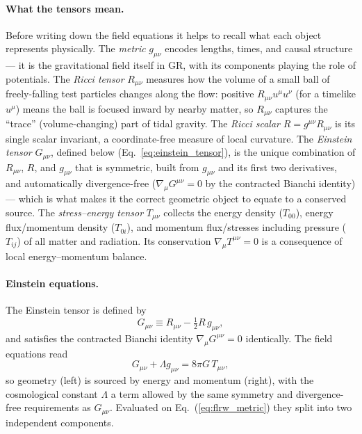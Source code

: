\documentclass[12pt]{article}
\begin{document}
\paragraph{What the tensors mean.}
Before writing down the field equations it helps to recall what each
object represents physically.  The \emph{metric} $g_{\mu\nu}$ encodes
lengths, times, and causal structure --- it is the gravitational
field itself in GR, with its components playing the role of
potentials.  The \emph{Ricci tensor} $R_{\mu\nu}$ measures how the
volume of a small ball of freely-falling test particles changes
along the flow: positive $R_{\mu\nu}u^\mu u^\nu$ (for a timelike
$u^\mu$) means the ball is focused inward by nearby matter, so
$R_{\mu\nu}$ captures the ``trace'' (volume-changing) part of tidal
gravity.  The \emph{Ricci scalar} $R = g^{\mu\nu}R_{\mu\nu}$ is its
single scalar invariant, a coordinate-free measure of local
curvature.  The \emph{Einstein tensor} $G_{\mu\nu}$, defined below
(Eq.~\ref{eq:einstein_tensor}), is the unique combination of
$R_{\mu\nu}$, $R$, and $g_{\mu\nu}$ that is symmetric, built from
$g_{\mu\nu}$ and its first two derivatives, and automatically
divergence-free ($\nabla_\mu G^{\mu\nu}=0$ by the contracted Bianchi
identity) --- which is what makes it the correct geometric object
to equate to a conserved source.  The \emph{stress--energy tensor} $T_{\mu\nu}$
collects the energy density ($T_{00}$), energy flux/momentum density
($T_{0i}$), and momentum flux/stresses including pressure
($T_{ij}$) of all matter and radiation.  Its conservation
$\nabla_\mu T^{\mu\nu}=0$ is a consequence of local
energy--momentum balance.

\paragraph{Einstein equations.}
The Einstein tensor is defined by
%
\begin{equation}
  G_{\mu\nu} \equiv R_{\mu\nu} - \tfrac{1}{2}R\,g_{\mu\nu},
  \label{eq:einstein_tensor}
\end{equation}
%
and satisfies the contracted Bianchi identity
$\nabla_\mu G^{\mu\nu}=0$ identically.  The field equations read
%
\begin{equation}
  G_{\mu\nu} + \Lambda g_{\mu\nu} = 8\pi G\,T_{\mu\nu},
  \label{eq:einstein_eq}
\end{equation}
%
so geometry (left) is sourced by energy and momentum (right), with
the cosmological constant $\Lambda$ a term allowed by the same
symmetry and divergence-free requirements as $G_{\mu\nu}$.
Evaluated on Eq.~(\ref{eq:flrw_metric}) they split into two
independent components.
\end{document}

